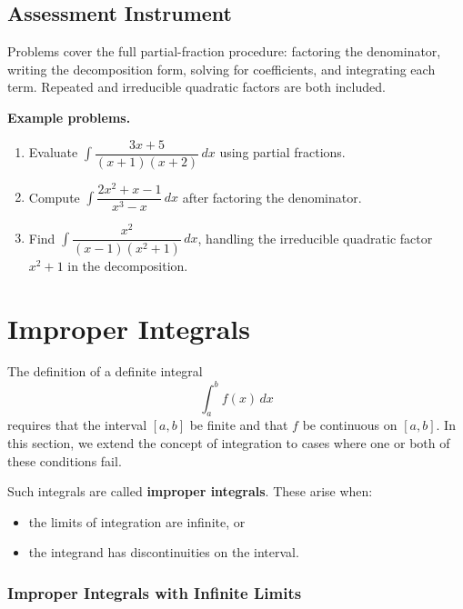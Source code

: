 \subsection{Assessment Instrument}
\label{ssec:part-8927}

Problems cover the full partial-fraction procedure: factoring the denominator, writing the decomposition form, solving for coefficients, and integrating each term. Repeated and irreducible quadratic factors are both included.

\textbf{Example problems.}

\begin{enumerate}
    \item Evaluate $\int\dfrac{3x+5}{(x+1)(x+2)}\,dx$ using partial fractions.
    \item Compute $\int\dfrac{2x^2+x-1}{x^3-x}\,dx$ after factoring the denominator.
    \item Find $\int\dfrac{x^2}{(x-1)(x^2+1)}\,dx$, handling the irreducible quadratic factor $x^2+1$ in the decomposition.
\end{enumerate}

\section{Improper Integrals}
\label{sec:improper-integrals}

The definition of a definite integral
\[
\int_a^b f(x)\,dx
\]
requires that the interval $[a,b]$ be finite and that $f$ be continuous 
on $[a,b]$. In this section, we extend the concept of integration to 
cases where one or both of these conditions fail.

\medskip

Such integrals are called \textbf{improper integrals}. These arise when:
\begin{itemize}
\item the limits of integration are infinite, or
\item the integrand has discontinuities on the interval.
\end{itemize}

\subsubsection{Improper Integrals with Infinite Limits}
\label{sss:impr-5c12}

